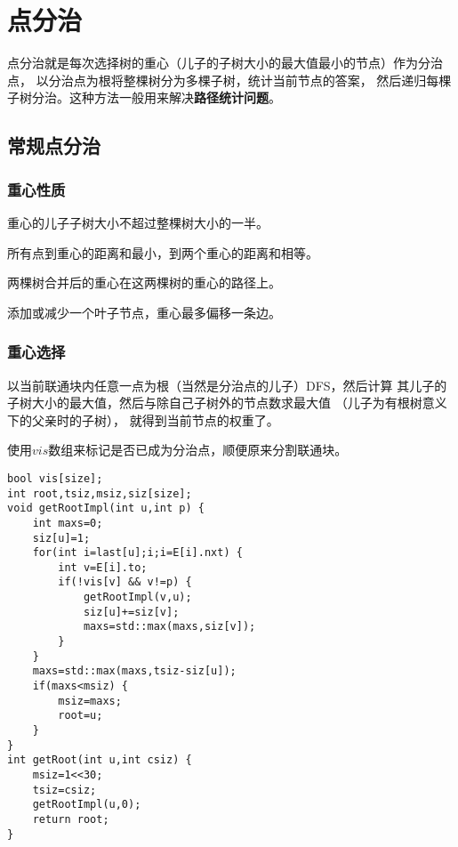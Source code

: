 \section{点分治}
点分治就是每次选择树的重心（儿子的子树大小的最大值最小的节点）作为分治点，
以分治点为根将整棵树分为多棵子树，统计当前节点的答案，
然后递归每棵子树分治。这种方法一般用来解决{\bfseries 路径统计问题}。
\subsection{常规点分治}
\subsubsection{重心性质}
\begin{property}\label{WPP}
    重心的儿子子树大小不超过整棵树大小的一半。
\end{property}
\begin{property}
    所有点到重心的距离和最小，到两个重心的距离和相等。
\end{property}
\begin{property}
    两棵树合并后的重心在这两棵树的重心的路径上。
\end{property}
\begin{property}
    添加或减少一个叶子节点，重心最多偏移一条边。
\end{property}
\subsubsection{重心选择}
以当前联通块内任意一点为根（当然是分治点的儿子）DFS，然后计算
其儿子的子树大小的最大值，然后与除自己子树外的节点数求最大值
（儿子为有根树意义下的父亲时的子树），
就得到当前节点的权重了。

使用$vis$数组来标记是否已成为分治点，顺便原来分割联通块。

\begin{lstlisting}[title=getRoot]
bool vis[size];
int root,tsiz,msiz,siz[size];
void getRootImpl(int u,int p) {
    int maxs=0;
    siz[u]=1;
    for(int i=last[u];i;i=E[i].nxt) {
        int v=E[i].to;
        if(!vis[v] && v!=p) {
            getRootImpl(v,u);
            siz[u]+=siz[v];
            maxs=std::max(maxs,siz[v]);
        }
    }
    maxs=std::max(maxs,tsiz-siz[u]);
    if(maxs<msiz) {
        msiz=maxs;
        root=u;
    }
}
int getRoot(int u,int csiz) {
    msiz=1<<30;
    tsiz=csiz;
    getRootImpl(u,0);
    return root;
}
\end{lstlisting}


